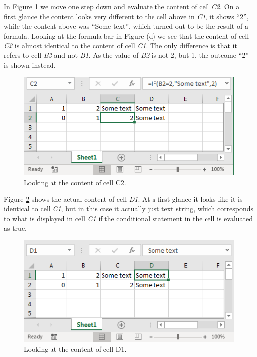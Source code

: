 \documentclass[]{book}
\begin{document}
In Figure \ref{fig:ex7} we move one step down and evaluate the content of cell \emph{C2}. On a first glance the content looks very different to the cell above in \emph{C1}, it shows ``2'', while the content above was ``Some text'', which turned out to be the result of a formula. Looking at the formula bar in Figure (d) we see that the content of cell \emph{C2} is almost identical to the content of cell \emph{C1}. The only difference is that it refers to cell \emph{B2} and not \emph{B1}. As the value of \emph{B2} is not 2, but 1, the outcome ``2'' is shown instead.

\begin{figure}

{\centering \includegraphics[width=0.75\linewidth]{_resources/chapter_excelbasic/ex5} 

}

\caption{Looking at the content of cell C2.}\label{fig:ex7}
\end{figure}

Figure \ref{fig:ex8} shows the actual content of cell \emph{D1}. At a first glance it looks like it is identical to cell \emph{C1}, but in this case it actually just text string, which corresponds to what is displayed in cell \emph{C1} if the conditional statement in the cell is evaluated as true.

\begin{figure}

{\centering \includegraphics[width=0.75\linewidth]{_resources/chapter_excelbasic/ex6} 

}

\caption{Looking at the content of cell D1.}\label{fig:ex8}
\end{figure}
\end{document}
